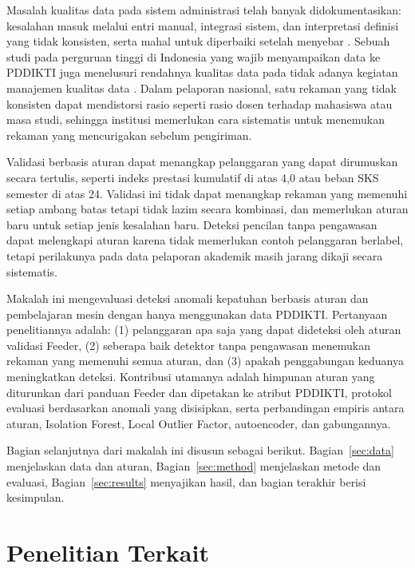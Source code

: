 \documentclass[conference]{IEEEtran}
\begin{document}
Masalah kualitas data pada sistem administrasi telah banyak didokumentasikan: kesalahan masuk melalui entri manual, integrasi sistem, dan interpretasi definisi yang tidak konsisten, serta mahal untuk diperbaiki setelah menyebar \cite{whang2023dataquality,zha2025dcai}. Sebuah studi pada perguruan tinggi di Indonesia yang wajib menyampaikan data ke PDDIKTI juga menelusuri rendahnya kualitas data pada tidak adanya kegiatan manajemen kualitas data \cite{sumadi2021dq}. Dalam pelaporan nasional, satu rekaman yang tidak konsisten dapat mendistorsi rasio seperti rasio dosen terhadap mahasiswa atau masa studi, sehingga institusi memerlukan cara sistematis untuk menemukan rekaman yang mencurigakan sebelum pengiriman.

Validasi berbasis aturan dapat menangkap pelanggaran yang dapat dirumuskan secara tertulis, seperti indeks prestasi kumulatif di atas 4,0 atau beban SKS semester di atas 24. Validasi ini tidak dapat menangkap rekaman yang memenuhi setiap ambang batas tetapi tidak lazim secara kombinasi, dan memerlukan aturan baru untuk setiap jenis kesalahan baru. Deteksi pencilan tanpa pengawasan dapat melengkapi aturan karena tidak memerlukan contoh pelanggaran berlabel, tetapi perilakunya pada data pelaporan akademik masih jarang dikaji secara sistematis.

Makalah ini mengevaluasi deteksi anomali kepatuhan berbasis aturan dan pembelajaran mesin dengan hanya menggunakan data PDDIKTI. Pertanyaan penelitiannya adalah: (1) pelanggaran apa saja yang dapat dideteksi oleh aturan validasi Feeder, (2) seberapa baik detektor tanpa pengawasan menemukan rekaman yang memenuhi semua aturan, dan (3) apakah penggabungan keduanya meningkatkan deteksi. Kontribusi utamanya adalah himpunan aturan yang diturunkan dari panduan Feeder dan dipetakan ke atribut PDDIKTI, protokol evaluasi berdasarkan anomali yang disisipkan, serta perbandingan empiris antara aturan, Isolation Forest, Local Outlier Factor, autoencoder, dan gabungannya.

Bagian selanjutnya dari makalah ini disusun sebagai berikut. Bagian~\ref{sec:data} menjelaskan data dan aturan, Bagian~\ref{sec:method} menjelaskan metode dan evaluasi, Bagian~\ref{sec:results} menyajikan hasil, dan bagian terakhir berisi kesimpulan.

\section{Penelitian Terkait}
\end{document}
